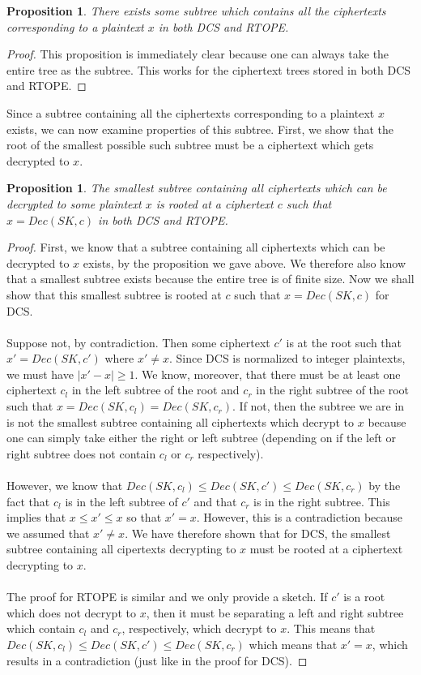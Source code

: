 \documentclass[12pt]{article}
\newtheorem{proposition}[theorem]{Proposition}
\begin{document}
\begin{proposition}
 There exists some subtree which contains all the ciphertexts corresponding to a plaintext $x$ in both DCS and RTOPE.
\end{proposition}
\begin{proof}
  This proposition is immediately clear because one can always take the entire tree as the subtree. This works for the ciphertext trees stored in both DCS and RTOPE.
\end{proof}

Since a subtree containing all the ciphertexts corresponding to a plaintext $x$ exists, we can now examine properties of this subtree. First, we show that the root of the smallest possible such subtree must be a ciphertext which gets decrypted to $x$. 

\begin{proposition}
  The smallest subtree containing all ciphertexts which can be decrypted to some plaintext $x$ is rooted at a ciphertext $c$ such that $x = Dec(SK, c)$ in both DCS and RTOPE.
\end{proposition}
\begin{proof}
  First, we know that a subtree containing all ciphertexts which can be decrypted to $x$ exists, by the proposition we gave above. We therefore also know that a smallest subtree exists because the entire tree is of finite size. Now we shall show that this smallest subtree is rooted at $c$ such that $x = Dec(SK, c)$ for DCS. \\ \\
Suppose not, by contradiction. Then some ciphertext $c'$ is at the root such that $x' = Dec(SK, c')$ where $x' \neq x$. Since DCS is normalized to integer plaintexts, we must have $|x' - x| \geq 1$. We know, moreover, that there must be at least one ciphertext $c_l$ in the left subtree of the root and $c_r$ in the right subtree of the root such that $x = Dec(SK, c_l) = Dec(SK, c_r)$. If not, then the subtree we are in is not the smallest subtree containing all ciphertexts which decrypt to $x$ because one can simply take either the right or left subtree (depending on if the left or right subtree does not contain $c_l$ or $c_r$ respectively). \\ \\
However, we know that $Dec(SK, c_l) \leq Dec(SK, c') \leq Dec(SK, c_r)$ by the fact that $c_l$ is in the left subtree of $c'$ and that $c_r$ is in the right subtree. This implies that $x \leq x' \leq x$ so that $x' = x$. However, this is a contradiction because we assumed that $x' \neq x$. We have therefore shown that for DCS, the smallest subtree containing all cipertexts decrypting to $x$ must be rooted at a ciphertext decrypting to $x$. \\ \\
The proof for RTOPE is similar and we only provide a sketch. If $c'$ is a root which does not decrypt to $x$, then it must be separating a left and right subtree which contain $c_l$ and $c_r$, respectively, which decrypt to $x$. This means that $Dec(SK, c_l) \leq Dec(SK, c') \leq Dec(SK, c_r)$ which means that $x' = x$, which results in a contradiction (just like in the proof for DCS).
\end{proof}
\end{document}
